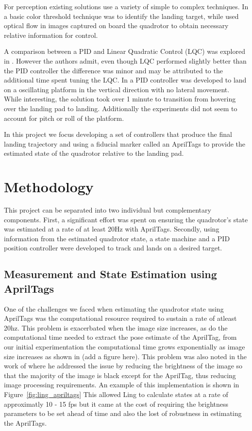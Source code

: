 \documentclass[11pt, twocolumn]{article}
\begin{document}
For perception existing solutions use a variety of simple to complex techniques. In \cite{Kim2014} a basic color threshold technique was to identify the landing target, while \cite{Herisse2012} used optical flow in images captured on board the quadrotor to obtain necessary relative information for control. 

A comparison between a PID and Linear Quadratic Control (LQC) was explored in \cite{Friis2009}. However the authors admit, even though LQC performed slightly better than the PID controller the difference was minor and may be attributed to the additional time spent tuning the LQC. In \cite{Herisse2012} a PID controller was developed to land on a oscillating platform in the vertical direction with no lateral movement. While interesting, the solution took over 1 minute to transition from hovering over the landing pad to landing. Additionally the experiments did not seem to account for pitch or roll of the platform. 

In this project we focus developing a set of controllers that produce the final landing trajectory and using a fiducial marker called an AprilTags \cite{apriltags} to provide the estimated state of the quadrotor relative to the landing pad. 

\section{Methodology}
This project can be separated into two individual but complementary components. First, a significant effort was spent on ensuring the quadrotor's state was estimated at a rate of at least 20Hz with AprilTags. Secondly, using information from the estimated quadrotor state, a state machine and a PID position controller were developed to track and lands on a desired target.

\subsection{Measurement and State Estimation using AprilTags}
One of the challenges we faced when estimating the quadrotor state using AprilTags was the computational resource required to sustain a rate of atleast 20hz. This problem is exacerbated when the image size increases, as do the computational time needed to extract the pose estimate of the AprilTag, from our initial experimentation the computational time grows exponentially as image size increases as shown in (add a figure here). This problem was also noted in the work of \cite{Ling2014} where he addressed the issue by reducing the brightness of the image so that the majority of the image is black except for the AprilTag, thus reducing image processing requirements. An example of this implementation is shown in Figure~\ref{fig:ling_apriltags} This allowed Ling \cite{Lee2012} to calculate states at a rate of approximatly 10 - 15 fps but it came at the cost of requiring the brightness parameters to be set ahead of time and also the lost of robustness in estimating the AprilTags.
\end{document}
